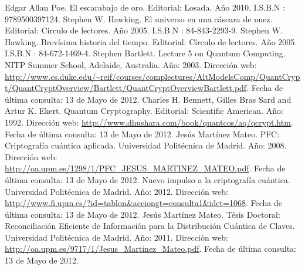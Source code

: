 \documentclass[a4paper,12pt,twoside,openright]{report}
\begin{document}





 

% 

\begin{thebibliography}{8}
 Edgar Allan Poe. El escarabajo de oro. Editorial: Losada. Año 2010. I.S.B.N : 9789500397124.
 Stephen W. Hawking. El universo en una cáscara de nuez. Editorial: Círculo de lectores. Año 2005. I.S.B.N : 84-843-2293-9.
  Stephen W. Hawking. Brevísima historia del tiempo. Editorial: Círculo de lectores. Año 2005. I.S.B.N : 84-672-1469-4.
 Stephen Bartlett. Lecture 5 on Quantum Computing. NITP Summer School, Adelaide, Australia. Año: 2003. Dirección web: \url{http://www.cs.duke.edu/~reif/courses/complectures/AltModelsComp/QuantCrypt/QuantCryptOverview/Bartlett/QuantCryptOverviewBartlett.pdf}. Fecha de última consulta: 13 de Mayo de 2012.
 Charles H. Bennett, Gilles Bras Sard and Artur K. Ekert. Quantum Cryptography. Editorial: Scientific American. Año: 1992. Dirección web: \url{http://www.dhushara.com/book/quantcos/aq/qcrypt.htm}. Fecha de última consulta: 13 de Mayo de 2012.
 Jesús Martínez Mateo. PFC: Criptografía cuántica aplicada. Universidad Politécnica de Madrid. Año: 2008. Dirección web: \url{http://oa.upm.es/1298/1/PFC_JESUS_MARTINEZ_MATEO.pdf}.  Fecha de última consulta: 13 de Mayo de 2012.
 Nuevo impulso a la criptografía cuántica. Universidad Politécnica de Madrid. Año: 2012. Dirección web: \url{http://www.fi.upm.es/?id=tablon&acciongt=consulta1&idet=1068}. Fecha de última consulta: 13 de Mayo de 2012. 
 Jesús Martínez Mateo. Tésis Doctoral: Reconciliación Eficiente de Información para la Distribución Cuántica de Claves. Universidad Politécnica de Madrid. Año: 2011. Dirección web: \url{http://oa.upm.es/9717/1/Jesus_Martinez_Mateo.pdf}. Fecha de última consulta: 13 de Mayo de 2012.
\end{thebibliography}
\end{document}
